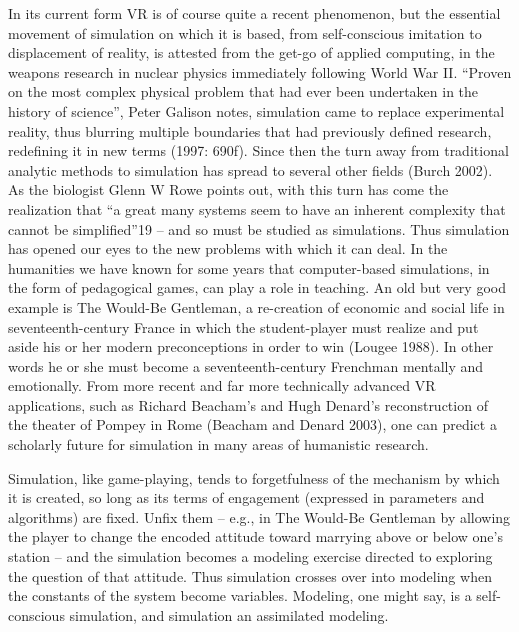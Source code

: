 In its current form VR is of course quite a recent phenomenon, but the
essential movement of simulation on which it is based, from
self-conscious imitation to displacement of reality, is attested from
the get-go of applied computing, in the weapons research in nuclear
physics immediately following World War II. ``Proven on the most complex
physical problem that had ever been undertaken in the history of
science'', Peter Galison notes, simulation came to replace experimental
reality, thus blurring multiple boundaries that had previously defined
research, redefining it in new terms (1997: 690f). Since then the turn
away from traditional analytic methods to simulation has spread to
several other fields (Burch 2002). As the biologist Glenn W Rowe points
out, with this turn has come the realization that ``a great many systems
seem to have an inherent complexity that cannot be simplified''19 -- and
so must be studied as simulations. Thus simulation has opened our eyes
to the new problems with which it can deal. In the humanities we have
known for some years that computer-based simulations, in the form of
pedagogical games, can play a role in teaching. An old but very good
example is The Would-Be Gentleman, a re-creation of economic and social
life in seventeenth-century France in which the student-player must
realize and put aside his or her modern preconceptions in order to win
(Lougee 1988). In other words he or she must become a
seventeenth-century Frenchman mentally and emotionally. From more recent
and far more technically advanced VR applications, such as Richard
Beacham's and Hugh Denard's reconstruction of the theater of Pompey in
Rome (Beacham and Denard 2003), one can predict a scholarly future for
simulation in many areas of humanistic research.

Simulation, like game-playing, tends to forgetfulness of the mechanism
by which it is created, so long as its terms of engagement (expressed in
parameters and algorithms) are fixed. Unfix them -- e.g., in The
Would-Be Gentleman by allowing the player to change the encoded attitude
toward marrying above or below one's station -- and the simulation
becomes a modeling exercise directed to exploring the question of that
attitude. Thus simulation crosses over into modeling when the constants
of the system become variables. Modeling, one might say, is a
self-conscious simulation, and simulation an assimilated modeling.

